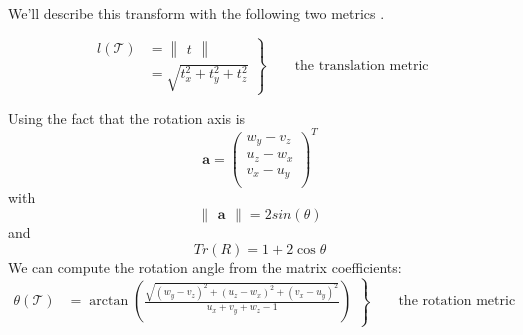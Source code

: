     We'll describe this transform with the following two metrics \cite{gend00}.
    
    \begin{equation} \label{eq:tf_transl_comp}
        \left.
        \begin{aligned}
        l(\mathcal{T}) &
        =   \begin{Vmatrix}
                t
            \end{Vmatrix} \\
         &
            = \sqrt{t_x^2+t_y^2+t_z^2}
        \end{aligned}
     \right\}
     \qquad \text{the translation metric}
    \end{equation}
    
    Using the fact that the rotation axis is 
    \[
        \mathbf{a}=\begin{pmatrix}
        w_y-v_z \\
        u_z-w_x \\
        v_x-u_y \\
        \end{pmatrix}^T
    \]
    with
    \[
        \begin{Vmatrix}
        \mathbf{a}
        \end{Vmatrix}
        =2sin(\theta)
    \]
    and 
    \[
        Tr(R) = 1 + 2\cos \theta
    \]
    We can compute the rotation angle from the matrix coefficients:
    \begin{equation} \label{eq:tf_rot_comp}
        \left.
        \begin{aligned}
        \theta(\mathcal{T}) &
        = \arctan \left( \frac{\sqrt{(w_y-v_z)^2 + (u_z-w_x)^2 + (v_x-u_y)^2 }}{u_x + v_y + w_z - 1} \right)
        \end{aligned}
     \right\}
     \qquad \text{the rotation metric}
    \end{equation}
